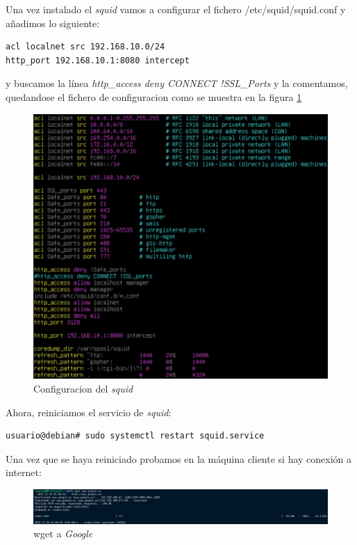\documentclass{report}
\begin{document}
Una vez instalado el \emph{squid} vamos a configurar el fichero /etc/squid/squid.conf y añadimos lo siguiente:

\begin{verbatim}
acl localnet src 192.168.10.0/24
http_port 192.168.10.1:8080 intercept
  \end{verbatim}

y buscamos la línea \emph{http\_access deny CONNECT !SSL\_Ports} y la comentamos, quedandose el fichero de configuracion como se muestra en la figura \ref{fig:squid config}

\begin{figure}[H]
  \centering
  \includegraphics[scale=0.65]{img/config_squid.png}
  \caption{Configuracion del \emph{squid}}
  \label{fig:squid config}
\end{figure}

Ahora, reiniciamos el servicio de \emph{squid}:
\begin{verbatim}
usuario@debian# sudo systemctl restart squid.service
  \end{verbatim}

Una vez que se haya reiniciado probamos en la máquina cliente si hay conexión a internet:

\begin{figure}[H]
  \centering
  \includegraphics[scale=0.37]{img/wget_google.png}
  \caption{wget a \emph{Google}}
  \label{fig:wget google}
\end{figure}
\end{document}
